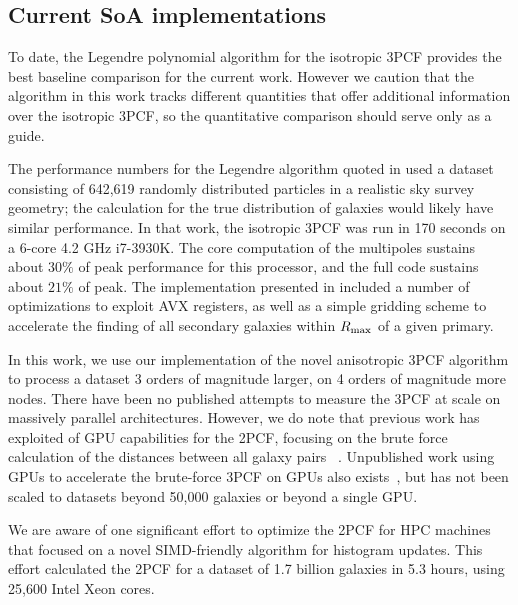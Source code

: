 \subsection{Current SoA implementations}
To date, the Legendre polynomial algorithm for the isotropic 3PCF provides the best baseline comparison for the current work. However we caution that the algorithm in this work tracks different quantities that offer additional information over the isotropic 3PCF, so the quantitative comparison should serve only as a guide.

The performance numbers for the Legendre algorithm quoted in \cite{SE3ptalg} used a dataset consisting of 642,619 randomly distributed particles in a realistic sky survey geometry; the calculation for the true distribution of galaxies would likely have similar performance. In that work, the isotropic 3PCF 
was run in 170 seconds on a 6-core 4.2 GHz i7-3930K. The core computation of the multipoles sustains about $30\%$ of peak performance for this processor, and the full code sustains about $21\%$ of peak. 
The implementation presented in \cite{SE3ptalg} included a number of optimizations to exploit AVX registers, as well as a simple gridding scheme to accelerate the finding of all secondary galaxies within $R_{\rm max}$ of a given primary.


In this work, we use our implementation of the novel anisotropic 3PCF algorithm  to process a dataset 3 orders of magnitude larger, on 4 orders of magnitude more nodes. There have been no published attempts to measure the 3PCF at scale on massively parallel architectures. 
However, we do note that previous work has exploited of GPU capabilities for the 2PCF, focusing on the brute force calculation of the distances between all galaxy pairs ~\cite{Bard2012,Ponce2012}. 
Unpublished work using GPUs to accelerate the brute-force 3PCF on GPUs also exists~\cite{Bard2014,Bellis2015}, but has not been scaled to datasets beyond 50,000 galaxies or beyond a single GPU. 

We are aware of one significant effort to optimize the 2PCF for HPC machines~\cite{Chhugani2012} that focused on a novel SIMD-friendly algorithm for histogram updates. This effort calculated the 2PCF for a dataset of 1.7 billion galaxies in 5.3 hours, using 25,600 Intel Xeon cores. 

